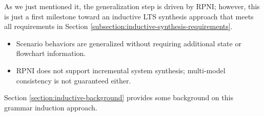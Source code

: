 




As we just mentioned it, the generalization step is driven by RPNI; however, this is just a first milestone toward an inductive LTS synthesis approach that meets all requirements in Section \ref{subsection:inductive-synthesis-requirements}. 
\begin{itemize}
\item Scenario behaviors are generalized without requiring additional state or flowchart information. 
\item RPNI does not support incremental system synthesis; multi-model consistency is not guaranteed either. 
\end{itemize}

Section \ref{section:inductive-background} provides some background on this grammar induction approach.


